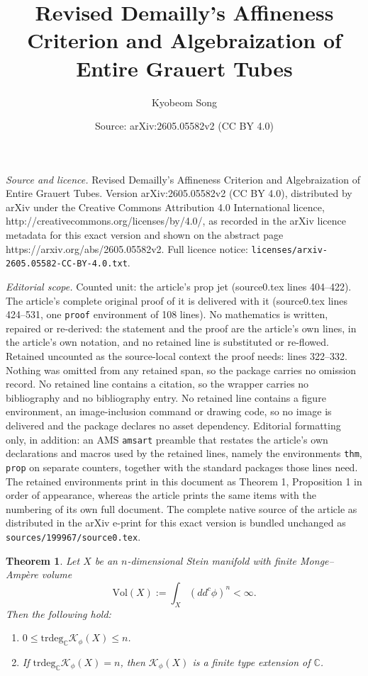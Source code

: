 \documentclass[10pt,a4paper]{amsart}
\title{Revised Demailly's Affineness Criterion and Algebraization of Entire Grauert Tubes}
\author{Kyobeom Song}
\date{Source: arXiv:2605.05582v2 (CC BY 4.0)}
\newtheorem{thm}{Theorem}
\newcommand{\Vol}{\mathrm{Vol}}
\newcommand{\bC}{\mathbb{C}}
\newcommand{\cK}{\mathcal{K}}
\newcommand{\trdeg}{\mathrm{trdeg}}
\begin{document}
\maketitle

\noindent\emph{Source and licence.} Revised Demailly's Affineness Criterion and Algebraization of Entire Grauert Tubes. Version arXiv:2605.05582v2 (CC BY 4.0), distributed by arXiv under the Creative Commons Attribution 4.0 International licence, http://creativecommons.org/licenses/by/4.0/, as recorded in the arXiv licence metadata for this exact version and shown on the abstract page https://arxiv.org/abs/2605.05582v2. Full licence notice: \texttt{licenses/arxiv-2605.05582-CC-BY-4.0.txt}.\par\smallskip

\noindent\textit{Editorial scope.} Counted unit: the article's prop jet (source0.tex lines 404--422). The article's complete original proof of it is delivered with it (source0.tex lines 424--531, one \texttt{proof} environment of 108 lines). No mathematics is written, repaired or re-derived: the statement and the proof are the article's own lines, in the article's own notation, and no retained line is substituted or re-flowed.  Retained uncounted as the source-local context the proof needs: lines 322--332.  Nothing was omitted from any retained span, so the package carries no omission record.  No retained line contains a citation, so the wrapper carries no bibliography and no bibliography entry.  No retained line contains a figure environment, an image-inclusion command or drawing code, so no image is delivered and the package declares no asset dependency.  Editorial formatting only, in addition: an AMS \texttt{amsart} preamble that restates the article's own declarations and macros used by the retained lines, namely the environments \texttt{thm}, \texttt{prop} on separate counters, together with the standard packages those lines need.  The retained environments print in this document as Theorem 1, Proposition 1 in order of appearance, whereas the article prints the same items with the numbering of its own full document.  The complete native source of the article as distributed in the arXiv e-print for this exact version is bundled unchanged as \texttt{sources/199967/source0.tex}.
\begin{thm}\label{trdeg}
Let $X$ be an $n$-dimensional Stein manifold with finite Monge--Amp\`ere volume
\[
\Vol(X):=\int_X (dd^c\phi)^n < \infty.
\]
Then the following hold:
\begin{enumerate}
\item $0\le \trdeg_{\bC}\cK_\phi(X)\le n$.
\item If $\trdeg_{\bC}\cK_\phi(X)=n$, then $\cK_\phi(X)$ is a finite type extension of $\bC$.
\end{enumerate}
\end{thm}
\end{document}
